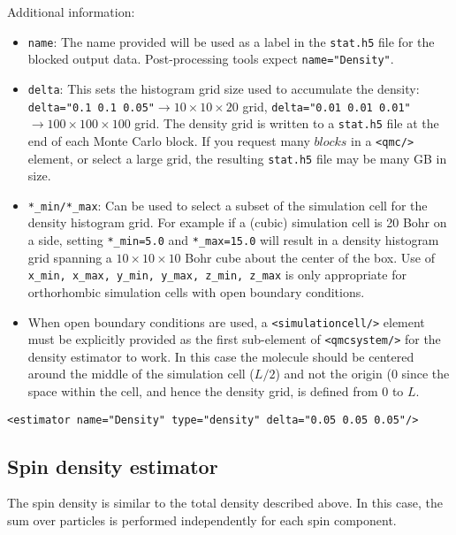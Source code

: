 Additional information:
\begin{itemize}
  \item{\texttt{name}: The name provided will be used as a label in the \texttt{stat.h5} file for the blocked output data.  Post-processing tools expect \texttt{name="Density"}.}
  \item{\texttt{delta}:  This sets the histogram grid size used to accumulate the density: \texttt{delta="0.1 0.1 0.05"}$\rightarrow 10\times 10\times 20$ grid, \texttt{delta="0.01 0.01 0.01"}$\rightarrow 100\times 100\times 100$ grid.  The density grid is written to a \texttt{stat.h5} file at the end of each Monte Carlo block.  If you request many $blocks$ in a \texttt{<qmc/>} element, or select a large grid, the resulting \texttt{stat.h5} file may be many GB in size.}
  \item{\texttt{*\_min/*\_max}: Can be used to select a subset of the simulation cell for the density histogram grid.  For example if a (cubic) simulation cell is 20 Bohr on a side, setting \texttt{*\_min=5.0} and \texttt{*\_max=15.0} will result in a density histogram grid spanning a $10\times 10\times 10$ Bohr cube about the center of the box.  Use of \texttt{x\_min, x\_max, y\_min, y\_max, z\_min, z\_max} is only appropriate for orthorhombic simulation cells with open boundary conditions.}
  \item{When open boundary conditions are used, a \texttt{<simulationcell/>} element must be explicitly provided as the first sub-element of \texttt{<qmcsystem/>} for the density estimator to work.  In this case the molecule should be centered around the middle of the simulation cell ($L/2$) and not the origin ($0$} since the space within the cell, and hence the density grid, is defined from $0$ to $L$.
\end{itemize}


\begin{lstlisting}[caption=Density estimator (uniform grid).]
   <estimator name="Density" type="density" delta="0.05 0.05 0.05"/>
\end{lstlisting}

\subsection{Spin density estimator}

The spin density is similar to the total density described above.  In this case, the sum over particles is performed independently for each spin component.

